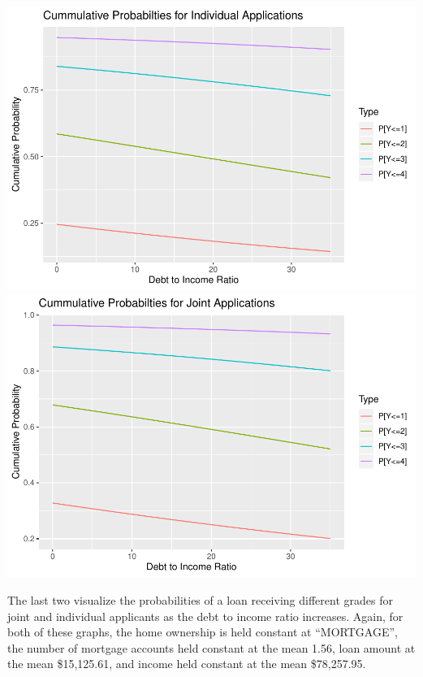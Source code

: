 \documentclass[11pt,]{article}
\begin{document}
\includegraphics{An-Analysis-of-LendingClub-Loan-Grades_files/figure-latex/unnamed-chunk-12-1.pdf}
\includegraphics{An-Analysis-of-LendingClub-Loan-Grades_files/figure-latex/unnamed-chunk-12-2.pdf}

The last two visualize the probabilities of a loan receiving different
grades for joint and individual applicants as the debt to income ratio
increases. Again, for both of these graphs, the home ownership is held
constant at ``MORTGAGE'', the number of mortgage accounts held constant
at the mean 1.56, loan amount at the mean \$15,125.61, and income held
constant at the mean \$78,257.95.
\end{document}
